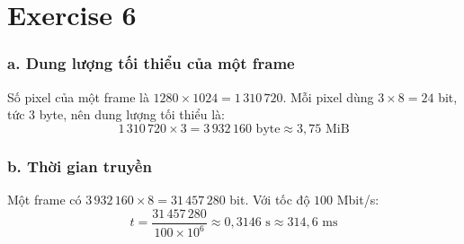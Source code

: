 \section{Exercise 6}

\subsubsection*{a. Dung lượng tối thiểu của một frame}

Số pixel của một frame là $1280 \times 1024 = 1\,310\,720$. Mỗi pixel dùng $3 \times 8 = 24$ bit, tức 3 byte, nên dung lượng tối thiểu là:
\[
  1\,310\,720 \times 3 = 3\,932\,160 \text{ byte} \approx 3{,}75 \text{ MiB}
\]

\subsubsection*{b. Thời gian truyền}

Một frame có $3\,932\,160 \times 8 = 31\,457\,280$ bit. Với tốc độ $100$ Mbit/s:
\[
  t = \frac{31\,457\,280}{100 \times 10^6} \approx 0{,}3146 \text{ s} \approx 314{,}6 \text{ ms}
\]
